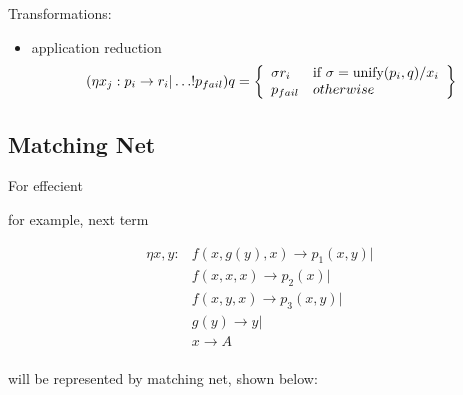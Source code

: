 \documentclass[12pt]{article}
\begin{document}
  Transformations:

\begin{itemize}
     \item application reduction
           $$ (\eta x_j : p_i \to r_i| \dots ! p_{fail} ) q = 
                    \left\{\begin{array}{l l}
                             \sigma r_i & \text{if $\sigma=\text{unify}(p_i,q)/x_{i}$} \\
                             p_{fail}   & otherwise \\
                           \end{array}
                    \right\} 
           $$
\end{itemize}


\subsection{ Matching Net }

  For effecient 

for example, next term

$$
 \begin{aligned}
  \eta x, y: & f(x,g(y),x)  \to {p_1}(x,y) | \\
                    & f(x,x,x)      \to {p_2}(x) | \\
                    & f(x,y,x)      \to {p_3}(x,y) | \\
                    & g(y)         \to y | \\
                    & x \to A \\
 \end{aligned}       
$$

 will be represented by matching net, shown below:
\end{document}
